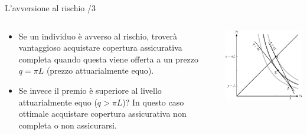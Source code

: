 \documentclass[aspectratio=149,11pt]{beamer}
\begin{document}
\begin{frame}{L'avversione al rischio /3}
\begin{columns}
\begin{column}{.5\columnwidth}
\begin{itemize}
\item Se un individuo è avverso al rischio, troverà vantaggioso acquistare
copertura assicurativa completa quando questa viene offerta a un prezzo
\(q=\pi L\) (prezzo \alert{attuarialmente equo}).
\item Se invece il premio è superiore al livello attuarialmente equo (\(q>\pi L\))?
In questo caso ottimale acquistare copertura assicurativa non completa o non
assicurarsi.
\end{itemize}
\end{column}

\begin{column}{.5\columnwidth}
\begin{center}
\includegraphics[width=.9\textwidth]{./figure/rischio-3.pdf}
\end{center}
\end{column}
\end{columns}
\end{frame}
\end{document}
